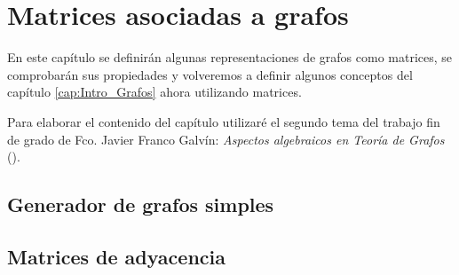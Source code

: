 \chapter{Matrices asociadas a grafos}

En este capítulo se definirán algunas representaciones de grafos como matrices,
se comprobarán sus propiedades y volveremos a definir algunos conceptos del 
capítulo \ref{cap:Intro_Grafos} ahora utilizando matrices.

Para elaborar el contenido del capítulo utilizaré el segundo tema del trabajo
fin de grado de Fco. Javier Franco Galvín: \textit{Aspectos algebraicos en
Teoría de Grafos} (\cite{Franco-tfg}).

\section{Generador de grafos simples}


\section{Matrices de adyacencia}

